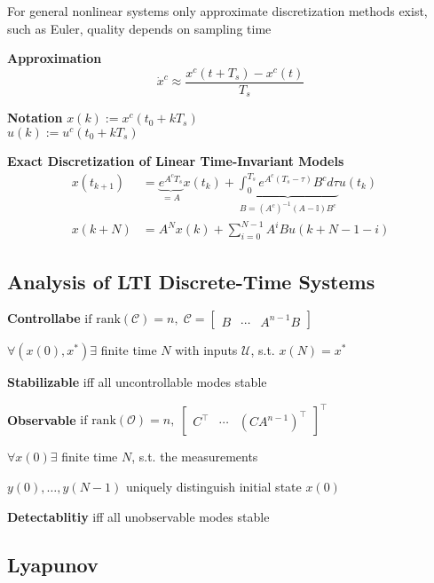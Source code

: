 For general nonlinear systems only approximate discretization methods
exist, such as Euler, quality depends on sampling time

\begin{minipage}[c]{0.5\linewidth}
	\textbf{Approximation}\\
	\[
		\dot{x}^c \approx \frac{x^c(t + T_s)-x^c(t)}{T_s}
	\]
\end{minipage}
\begin{minipage}[c]{0.45\linewidth}
	\center\textbf{Notation}
	$x(k):= x^c(t_0+kT_s)$\\
	$u(k):= u^c(t_0+kT_s)$\\
\end{minipage}
\textbf{Exact Discretization of Linear Time-Invariant Models}
\[\begin{aligned}
		x(t_{k+1}) & =
		\underbrace{e^{A^c T_s}}
		_{=A} x(t_k) +
		\underbrace{\textstyle\int_{0}^{T_s}
			e^{A^c(T_s - \tau)}B^c d\tau}
		_{B=(A^c)^{-1}(A-\mathbb{I})B^c} u(t_k)
		\\
		x(k+N)     & = A^N x(k) + \textstyle\sum_{i=0}^{N-1}
		A^i B u(k+N-1-i)
	\end{aligned} \]

\subsection{Analysis of LTI Discrete-Time Systems}



\textbf{Controllabe}
$
	\text{if rank}(\mathcal{C}) = n
	,\;
	\mathcal{C} =
	\begin{bmatrix}
		B & \cdots & A^{n-1} B
	\end{bmatrix}
$

$\forall(x(0),x^*)\exists$ finite time $N$
with inputs $\mathcal{U}$, s.t. $x(N)=x^*$

\textbf{Stabilizable} iff all uncontrollable modes stable

\textbf{Observable}
$
	\text{if rank}(\mathcal{O}) = n
	,\;
	\begin{bmatrix}
		C^\top & \cdots & (CA^{n-1})^\top
	\end{bmatrix}^\top
$

$\forall x(0)\exists$ finite time $N$, s.t. the measurements

$y(0), \dots, y(N-1)$
uniquely distinguish initial state $x(0)$

\textbf{Detectablitiy} iff all unobservable modes stable

\subsection{Lyapunov}

